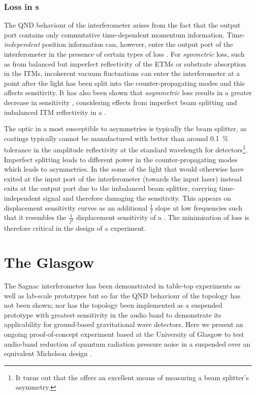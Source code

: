 \subsubsection{Loss in \SSM{}s}
The \gls{QND} behaviour of the interferometer arises from the fact that the output port contains only commutative time-dependent momentum information. Time-\emph{independent} position information can, however, enter the output port of the interferometer in the presence of certain types of loss \cite{Danilishin2004}. For \emph{symmetric} loss, such as from balanced but imperfect reflectivity of the \glspl{ETM} or substrate absorption in the \glspl{ITM}, incoherent vacuum fluctuations can enter the interferometer at a point after the light has been split into the counter-propagating modes and this affects sensitivity. It has also been shown that \emph{asymmetric} loss results in a greater decrease in sensitivity \cite{Danilishin2015}, considering effects from imperfect beam splitting and imbalanced \gls{ITM} reflectivity in a \SSM{}.

The optic in a \SSM{} most susceptible to asymmetries is typically the beam splitter, as coatings typically cannot be manufactured with better than around \SI{0.1}{\percent} tolerance in the amplitude reflectivity at the standard wavelength for detectors\footnote{It turns out that the \SSM{} offers an excellent means of measuring a beam splitter's asymmetry.}. Imperfect splitting leads to different power in the counter-propagating modes which leads to asymmetries. In the \SSM{} some of the light that would otherwise have exited at the input port of the interferometer (towards the input laser) instead exits at the output port due to the imbalanced beam splitter, carrying time-independent signal and therefore damaging the sensitivity. This appears on displacement sensitivity curves as an additional $\frac{1}{f}$ slope at low frequencies such that it resembles the $\frac{1}{f^2}$ displacement sensitivity of a \MI{}. The minimisation of loss is therefore critical in the design of a \SSM{} experiment.

\section{The Glasgow \SSMEXPT{}}
The Sagnac interferometer has been demonstrated in table-top experiments \cite{Shaddock1998} as well as lab-scale prototypes \cite{Beyersdorf2002, Eberle2010} but so far the \gls{QND} behaviour of the \SSM{} topology has not been shown; nor has the topology been implemented as a suspended prototype with greatest sensitivity in the audio band to demonstrate its applicability for ground-based gravitational wave detectors. Here we present an ongoing proof-of-concept experiment based at the University of Glasgow to test audio-band reduction of quantum radiation pressure noise in a suspended \SSM{} over an equivalent Michelson design \cite{Graef2014}.

